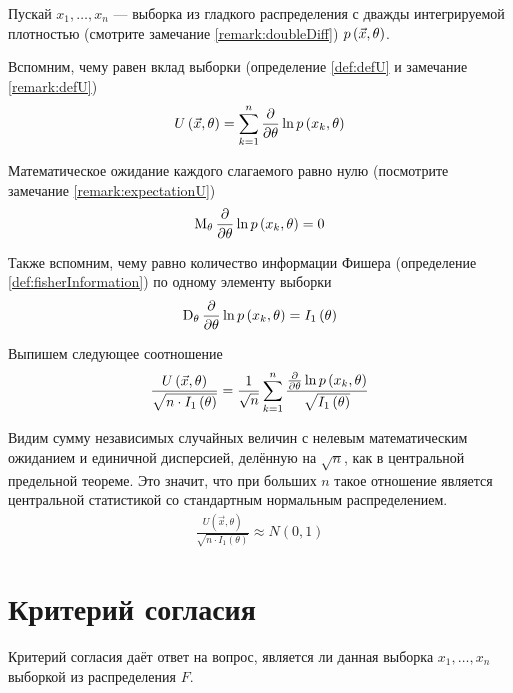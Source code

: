 Пускай $x_1, \dots, x_n$ --- выборка из гладкого распределения с дважды
интегрируемой плотностью (смотрите замечание \ref{remark:doubleDiff})
$p\left(\vec{x}, \theta\right)$.

Вспомним, чему равен вклад выборки (определение \ref{def:defU} и замечание
\ref{remark:defU})
\begin{align*}
    U\left( \vec{x},\theta \right)
    = \sum_{k=1}^n\frac{\partial}{\partial\theta}\ln{p\left(x_k,\theta\right)}
\end{align*}

Математическое ожидание каждого слагаемого равно нулю
(посмотрите замечание \ref{remark:expectationU})
\begin{align*}
    \operatorname{M}_{\theta} \frac{\partial}{\partial \theta} \ln{p\left(x_k, \theta\right)}
    = 0
\end{align*}

Также вспомним, чему равно количество информации Фишера (определение
\ref{def:fisherInformation}) по одному элементу выборки
\begin{align*}
    \operatorname{D}_{\theta} \frac{\partial}{\partial\theta}
        \ln{p\left(x_k, \theta\right)}
    = I_1\left( \theta \right)
\end{align*}

Выпишем следующее соотношение
\begin{align*}
    \frac{U\left( \vec{x}, \theta \right)}{
        \sqrt{n \cdot I_1\left( \theta \right)}}
    = \frac{1}{\sqrt{n}} \sum_{k=1}^{n}\frac{
        \frac{\partial}{\partial\theta}\ln{p\left(x_k, \theta\right)}}{
        \sqrt{I_1\left( \theta \right)}}
\end{align*}

Видим сумму независимых случайных величин с нелевым математическим ожиданием и
единичной дисперсией, делённую на $\sqrt{n}$, как в центральной предельной
теореме. Это значит, что при больших $n$ такое отношение является центральной
статистикой со стандартным нормальным распределением.
\begin{align*}
    \frac{U\left( \vec{x}, \theta \right)}{
        \sqrt{n \cdot I_1\left( \theta \right)}} \approx N\left( 0, 1 \right)
\end{align*}

\section{Критерий согласия}

Критерий согласия даёт ответ на вопрос, является ли данная выборка
$x_1, \dots, x_n$ выборкой из распределения $F$.

